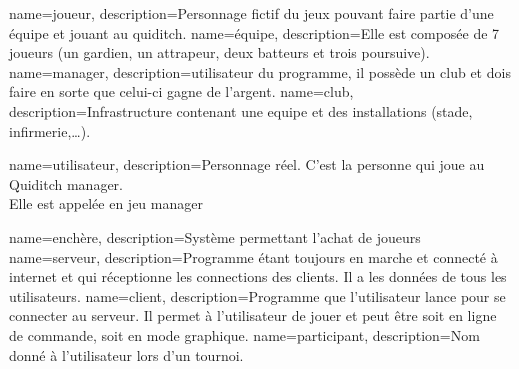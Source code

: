 {
    name=joueur,
    description={Personnage fictif du jeux pouvant faire partie d'une équipe et jouant au quiditch.}
}
{
    name=équipe,
    description={Elle est composée de 7 \glspl{joueur} (un gardien, un attrapeur, deux batteurs et trois poursuive).}
}
{
    name=manager,
    description={\Gls{utilisateur} du programme, il possède un \gls{club} et dois faire en sorte que celui-ci gagne de l'argent.}
}
{
    name=club,
    description={Infrastructure contenant une \gls{equipe} et des installations (stade, infirmerie,\ldots).}
}

{
    name=utilisateur,
    description={Personnage réel. C'est la personne qui joue au Quiditch manager.\\
    Elle est appelée en jeu \gls{manager}}
}

{
    name=enchère,
    description={Système permettant l'achat de \glspl{joueur}}
}
{
    name=serveur,
    description={Programme étant toujours en marche et connecté à internet et qui réceptionne les connections des \glspl{client}. Il a les données de tous les \glspl{utilisateur}.}
}
{
    name=client,
    description={Programme que l'\gls{utilisateur} lance pour se connecter au \gls{serveur}. Il permet à l'\gls{utilisateur} de jouer et peut être soit en ligne de commande, soit en mode graphique.}
}
{
    name=participant,
    description={Nom donné à l'\gls{utilisateur} lors d'un tournoi.}
}


